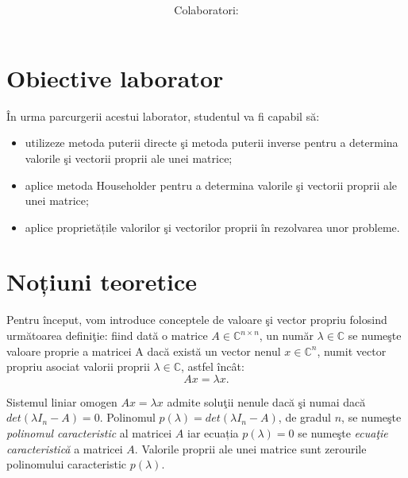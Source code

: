 \documentclass{exam}
\title{
	\textmd{\textbf{\MNLabTitle}}
	\author{Colaboratori: \MNAuthor}
}
\begin{document}
\begin{coverpages}

	\maketitle
	\tableofcontents

\end{coverpages}

\section{Obiective laborator}

În urma parcurgerii acestui laborator, studentul va fi capabil să:

\begin{itemize}
	\item utilizeze metoda puterii directe şi metoda puterii inverse pentru a determina valorile şi vectorii proprii ale unei matrice;
	\item aplice metoda Householder pentru a determina valorile şi vectorii proprii ale unei matrice;
	\item aplice proprietățile valorilor şi vectorilor proprii în rezolvarea unor probleme.
\end{itemize}



\section{Noțiuni teoretice}

Pentru început, vom introduce conceptele de valoare şi vector propriu folosind următoarea definiţie: fiind dată o matrice $A\in\mathbb{C}^{n\times n}$, un număr $\lambda \in \mathbb{C}$ se numeşte valoare proprie a matricei A dacă există un vector nenul $x \in \mathbb{C}^{n}$, numit vector propriu asociat valorii proprii $\lambda \in \mathbb{C}$, astfel încât:
$$Ax = \lambda x.$$

Sistemul liniar omogen $Ax = \lambda x$ admite soluţii nenule dacă şi numai dacă $det(\lambda I_{n} - A) = 0$. Polinomul $p(\lambda)=det(\lambda I_{n} - A)$, de gradul $n$, se numeşte \textit{polinomul caracteristic} al matricei $A$ iar ecuația $p(\lambda)=0$ se numeşte  \textit{ecuaţie caracteristică} a  matricei $A$. Valorile proprii ale unei matrice sunt zerourile polinomului caracteristic $p(\lambda)$.
\end{document}
